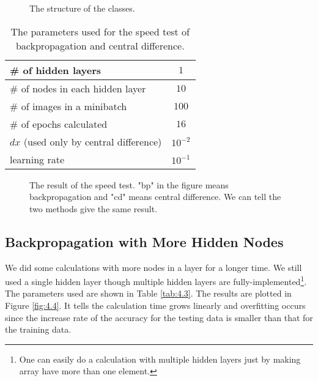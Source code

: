 \documentclass{article}
\theoremstyle{definition}
\newcommand{\fig}[1]{Figure \ref{fig:#1}}
\newcommand{\tab}[1]{Table \ref{tab:#1}}
\begin{document}
\begin{figure}[H]
    \centering
    \begin{subfigure}[H]{1.0\textwidth}
	\end{subfigure}
    \caption{The structure of the classes.}
    \label{fig:4.2}
\end{figure}

\begin{table}[H]
    \centering
    \begin{tabular}{|l|c|} \hline
    \# of hidden layers & $1$ \\ \hline
    \# of nodes in each hidden layer & $10$ \\ \hline
    \# of images in a minibatch & $100$ \\ \hline
    \# of epochs calculated & $16$ \\ \hline
    $dx$ (used only by central difference) & $10^{-2}$ \\ \hline
    learning rate & $10^{-1}$ \\ \hline
    \end{tabular}
    \caption{The parameters used for the speed test of backpropagation and central difference.}
    \label{tab:4.2}
\end{table}

\begin{figure}[H]
    \centering
    \begin{subfigure}[H]{1.0\textwidth}
	\end{subfigure}
    \caption{The result of the speed test. "bp" in the figure means backpropagation and "cd" means central difference. We can tell the two methods give the same result.}
    \label{fig:4.3}
\end{figure}

\subsection{Backpropagation with More Hidden Nodes} \label{section:4.4}

We did some calculations with more nodes in a layer for a longer time. We still used a single hidden layer though multiple hidden layers are fully-implemented\footnote{One can easily do a calculation with multiple hidden layers just by making  array have more than one element.}. The parameters used are shown in \tab{4.3}. The results are plotted in \fig{4.4}. It tells the calculation time grows linearly and overfitting occurs since the increase rate of the accuracy for the testing data is smaller than that for the training data.
\end{document}

